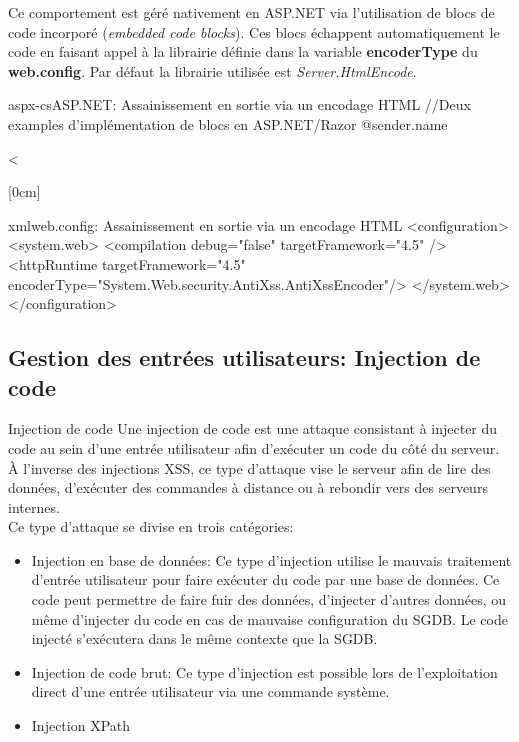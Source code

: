 \documentclass[twoside,a4paper,12pt,titlepage]{book}
\newcommand{\MarginPar}[2]{\marginnote{\scriptsize #1}[#2]}
\begin{document}
Ce comportement est géré nativement en ASP.NET via l'utilisation de blocs de code incorporé (\textit{embedded code blocks}). Ces blocs échappent automatiquement le code en faisant appel à la librairie définie dans la variable \textbf{encoderType} du \textbf{web.config}. Par défaut la librairie utilisée est \textit{Server.HtmlEncode}.\\
\begin{Config}{aspx-cs}{ASP.NET: Assainissement en sortie via un encodage HTML}
	//Deux examples d'implémentation de blocs en ASP.NET/Razor
	@sender.name
	
	<%
\end{Config}
\MarginPar{\textbf{ASP.NET}: Assainissement en sortie - REGEX}{0cm}
\begin{Config}{xml}{web.config: Assainissement en sortie via un encodage HTML}
<configuration>
	<system.web>
		<compilation debug="false" targetFramework="4.5" />
		<httpRuntime targetFramework="4.5" 
			encoderType="System.Web.security.AntiXss.AntiXssEncoder"/>
	</system.web>
</configuration>
\end{Config}

\subsection{Gestion des entrées utilisateurs: Injection de code}
\begin{Define}{Injection de code}
Une injection de code est une attaque consistant à injecter du code au sein d'une entrée utilisateur afin d'exécuter un code du côté du serveur. \`A l'inverse des injections XSS, ce type d'attaque vise le serveur afin de lire des données, d'exécuter des commandes à distance ou à rebondir vers des serveurs internes.\\
Ce type d'attaque se divise en trois catégories:\begin{itemize}
\item Injection en base de données: Ce type d'injection utilise le mauvais traitement d'entrée utilisateur pour faire exécuter du code par une base de données. Ce code peut permettre de faire fuir des données, d'injecter d'autres données, ou même d'injecter du code en cas de mauvaise configuration du \gls{SGDB}. Le code injecté s'exécutera dans le même contexte que la \gls{SGDB}.
\item Injection de code brut: Ce type d'injection est possible lors de l'exploitation direct d'une entrée utilisateur via une commande système.
\item Injection XPath
\end{itemize}
\end{Define}
\end{document}
